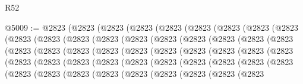 \begin{lexlean}{R52}
\begin{coremodule}
@5009 := @2823
    (@2823
      (@2823
        (@2823
          (@2823
            (@2823
              (@2823
                (@2823
                  (@2823
                    (@2823
                      (@2823
                        (@2823
                          (@2823
                            (@2823
                              (@2823
                                (@2823
                                  (@2823
                                    (@2823
                                      (@2823
                                        (@2823
                                          (@2823
                                            (@2823
                                              (@2823
                                                (@2823
                                                  (@2823
                                                    (@2823
                                                      (@2823
                                                        (@2823
                                                          (@2823
                                                            (@2823
                                                              (@2823
                                                                (@2823
                                                                  (@2823
                                                                    (@2823
                                                                      (@2823
                                                                        (@2823
                                                                          (@2823
                                                                            (@2823
                                                                              (@2823
                                                                                (@2823
                                                                                  (@2823
                                                                                    (@2823
                                                                                      (@2823
                                                                                        (@2823
                                                                                          (@2823
                                                                                            (@2823
                                                                                              (@2823
                                                                                                (@2823

\end{coremodule}
\end{lexlean}
